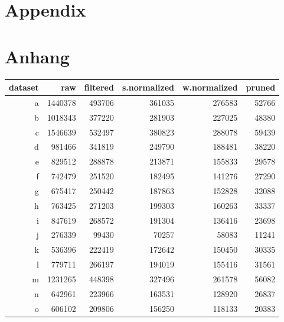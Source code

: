 {\chapter{Appendix}}    %
{\chapter{Anhang}}      %
\label{chap:appendix}

\begin{table}[ht]
    \centering
    \begin{tabularx}{\textwidth}{r R R R R R}
        \toprule
        dataset & raw & filtered & s.normalized & w.normalized & pruned\\
        \midrule
        a & \num{1440378} & \num{493706} & \num{361035} & \num{276583} & \num{52766}\\
        b & \num{1018343} & \num{377220} & \num{281903} & \num{227025} & \num{48380}\\
        c & \num{1546639} & \num{532497} & \num{380823} & \num{288078} & \num{59439}\\
        d & \num{981466} & \num{341819} & \num{249790} & \num{188481} & \num{38220}\\
        e & \num{829512} & \num{288878} & \num{213871} & \num{155833} & \num{29578}\\
        f & \num{742479} & \num{251520} & \num{182495} & \num{141276} & \num{27290}\\
        g & \num{675417} & \num{250442} & \num{187863} & \num{152828} & \num{32088}\\
        h & \num{763425} & \num{271203} & \num{199303} & \num{160263} & \num{33337}\\
        i & \num{847619} & \num{268572} & \num{191304} & \num{136416} & \num{23698}\\
        j & \num{276339} & \num{99430} & \num{70257} & \num{58083} & \num{11241}\\
        k & \num{536396} & \num{222419} & \num{172642} & \num{150450} & \num{30335}\\
        l & \num{779711} & \num{266197} & \num{194019} & \num{155416} & \num{31561}\\
        m & \num{1231265} & \num{448398} & \num{327496} & \num{261578} & \num{56082}\\
        n & \num{642961} & \num{223966} & \num{163531} & \num{128920} & \num{26837}\\
        o & \num{606102} & \num{209806} & \num{156250} & \num{118133} & \num{20383}\\

\end{tabularx}
\end{table}
